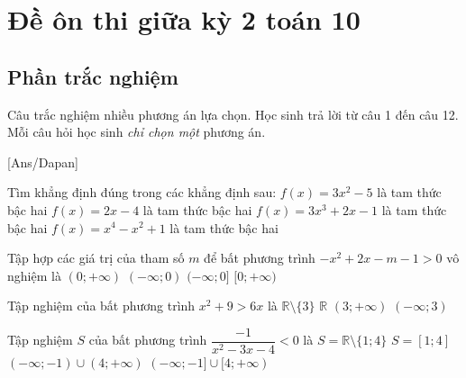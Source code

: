\section{Đề ôn thi giữa kỳ 2 toán 10}
\subsection{Phần trắc nghiệm}
Câu trắc nghiệm nhiều phương án lựa chọn. Học sinh trả lời từ
câu 1 đến câu 12. Mỗi câu hỏi học sinh \textit{chỉ chọn một} phương án.

[Ans/Dapan]
 
\hienthiloigiaiex
\begin{ex}%
	Tìm khẳng định đúng trong các khẳng định sau:
	\choice
	{\True $f(x)=3x^2-5$ là tam thức bậc hai}
	{$f(x)=2x-4$ là tam thức bậc hai}
	{$f(x)=3x^3+2x-1$ là tam thức bậc hai}
	{$f(x)=x^4-x^2+1$ là tam thức bậc hai}
\end{ex}

\begin{ex}%
	Tập hợp các giá trị của tham số $m$ để bất phương trình $-x^2+2x-m-1>0$ vô nghiệm là 
	\choice
	{$(0;+\infty)$}
	{$(-\infty;0)$}
	{$(-\infty;0]$}
	{\True $[0;+\infty)$}
\end{ex}
\begin{ex}%
	Tập nghiệm của bất phương trình $x^2+9>6x$ là
	\choice
	{\True $\mathbb{R}\setminus \{3\}$}
	{$\mathbb{R}$}
	{$(3;+\infty)$}
	{$(-\infty;3)$}
\end{ex}

\begin{ex}%
	Tập nghiệm $S$ của bất phương trình $\dfrac{-1}{x^2-3x-4}<0$ là
	\choice
	{$S=\mathbb{R}\setminus \{1;4\}$}
	{$S=[1;4]$}
	{\True $(-\infty;-1)\cup (4;+\infty)$}
	{$(-\infty;-1]\cup [4;+\infty)$}
\end{ex}

